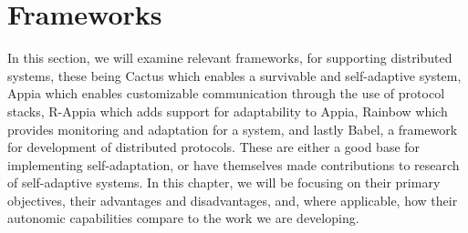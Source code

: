 \section{Frameworks}
\label{sec:frameworks}
\par In this section, we will examine relevant frameworks, for supporting distributed systems, these being Cactus which enables a survivable and self-adaptive system, Appia which enables customizable communication through the use of protocol stacks, R-Appia which adds support for adaptability to Appia, Rainbow which provides monitoring and adaptation for a system, and lastly Babel, a framework for development of distributed protocols. %
These are either a good base for implementing self-adaptation, or have themselves made contributions to research of self-adaptive systems. In this chapter, we will be focusing on their primary objectives, their advantages and disadvantages, and, where applicable, how their autonomic capabilities compare to the work we are developing. %
%
%
%
